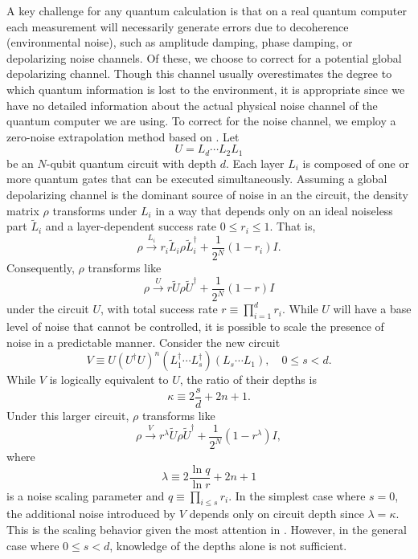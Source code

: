 \documentclass[aps,10pt,superscriptaddress,floatfix,nofootinbib,notitlepage]{revtex4-1}
\begin{document}
A key challenge for any quantum calculation is that on a real quantum computer each measurement will necessarily generate errors due to decoherence (environmental noise), such as amplitude damping, phase damping, or depolarizing noise channels. Of these, we choose to correct for a potential global depolarizing channel. Though this channel usually overestimates the degree to which quantum information is lost to the environment, it is appropriate since we have no detailed information about the actual physical noise channel of the quantum computer we are using. To correct for the noise channel, we employ a zero-noise extrapolation method based on \cite{Giurgica_Tiron_2020}. Let
\begin{equation}
    U=L_d\cdots L_2L_1
\end{equation}
be an $N$-qubit quantum circuit with depth $d$. Each layer $L_i$ is composed of one or more quantum gates that can be executed simultaneously. Assuming a global depolarizing channel is the dominant source of noise in an the circuit, the density matrix $\rho$ transforms under $L_i$ in a way that depends only on an ideal noiseless part $\tilde{L}_i$ and a layer-dependent success rate $0\leq r_i\leq1$. That is,
\begin{equation}
    \rho
    \xrightarrow{L_i}
    r_i\tilde{L}_i\rho\tilde{L}_i^\dag
    +\frac{1}{2^N}
    (1-r_i)
    I.
\end{equation}
Consequently, $\rho$ transforms like
\begin{equation}
    \rho
    \xrightarrow{U}
    r\tilde{U}\rho\tilde{U}^\dag
    +\frac{1}{2^N}
    (1-r)
    I
\end{equation}
under the circuit $U$, with total success rate $r\equiv\prod_{i=1}^dr_i$. While $U$ will have a base level of noise that cannot be controlled, it is possible to scale the presence of noise in a predictable manner. Consider the new circuit
\begin{equation}\label{eq:folding}
    V
    \equiv
    U
    (U^\dag U)^n
    (L_1^\dag\cdots L_s^\dag)
    (L_s\cdots L_1),
    \quad
    0\leq s<d.
\end{equation}
While $V$ is logically equivalent to $U$, the ratio of their depths is
\begin{equation}
    \kappa
    \equiv
    2\frac{s}{d}
    +2n+1.
\end{equation}
Under this larger circuit, $\rho$ transforms like
\begin{equation}
    \rho
    \xrightarrow{V}
    r^\lambda\tilde{U}\rho\tilde{U}^\dag
    +\frac{1}{2^N}
    (1-r^\lambda)
    I,
\end{equation}
where
\begin{equation}
    \lambda
    \equiv
    2\frac{\ln q}{\ln r}
    +2n+1
\end{equation}
is a noise scaling parameter and $q\equiv\prod_{i\leq s}r_i$. In the simplest case where $s=0$, the additional noise introduced by $V$ depends only on circuit depth since $\lambda=\kappa$. This is the scaling behavior given the most attention in \cite{Giurgica_Tiron_2020}. However, in the general case where $0\leq s<d$, knowledge of the depths alone is not sufficient. 
\end{document}
